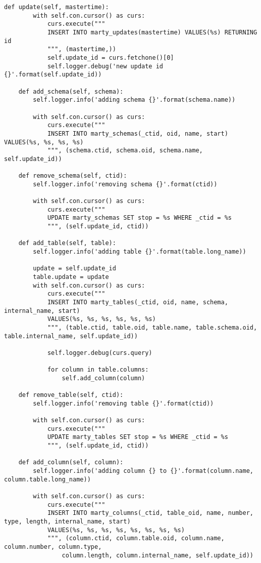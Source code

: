 \begin{lstlisting}[caption={populator.py}]
    def update(self, mastertime):
        with self.con.cursor() as curs:
            curs.execute("""
            INSERT INTO marty_updates(mastertime) VALUES(%s) RETURNING id
            """, (mastertime,))
            self.update_id = curs.fetchone()[0]
            self.logger.debug('new update id {}'.format(self.update_id))

    def add_schema(self, schema):
        self.logger.info('adding schema {}'.format(schema.name))

        with self.con.cursor() as curs:
            curs.execute("""
            INSERT INTO marty_schemas(_ctid, oid, name, start) VALUES(%s, %s, %s, %s)
            """, (schema.ctid, schema.oid, schema.name, self.update_id))

    def remove_schema(self, ctid):
        self.logger.info('removing schema {}'.format(ctid))

        with self.con.cursor() as curs:
            curs.execute("""
            UPDATE marty_schemas SET stop = %s WHERE _ctid = %s
            """, (self.update_id, ctid))

    def add_table(self, table):
        self.logger.info('adding table {}'.format(table.long_name))

        update = self.update_id
        table.update = update
        with self.con.cursor() as curs:
            curs.execute("""
            INSERT INTO marty_tables(_ctid, oid, name, schema, internal_name, start)
            VALUES(%s, %s, %s, %s, %s, %s)
            """, (table.ctid, table.oid, table.name, table.schema.oid, table.internal_name, self.update_id))

            self.logger.debug(curs.query)

            for column in table.columns:
                self.add_column(column)

    def remove_table(self, ctid):
        self.logger.info('removing table {}'.format(ctid))

        with self.con.cursor() as curs:
            curs.execute("""
            UPDATE marty_tables SET stop = %s WHERE _ctid = %s
            """, (self.update_id, ctid))

    def add_column(self, column):
        self.logger.info('adding column {} to {}'.format(column.name, column.table.long_name))

        with self.con.cursor() as curs:
            curs.execute("""
            INSERT INTO marty_columns(_ctid, table_oid, name, number, type, length, internal_name, start)
            VALUES(%s, %s, %s, %s, %s, %s, %s, %s)
            """, (column.ctid, column.table.oid, column.name, column.number, column.type,
                column.length, column.internal_name, self.update_id))


\end{lstlisting}
